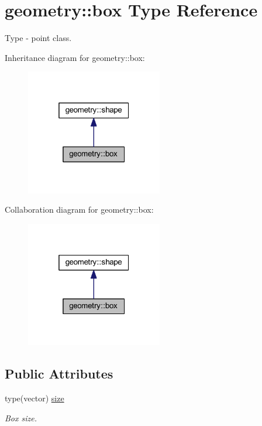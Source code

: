 \hypertarget{structgeometry_1_1box}{}\section{geometry\+:\+:box Type Reference}
\label{structgeometry_1_1box}


Type -\/ point class.  




Inheritance diagram for geometry\+:\+:box\+:\nopagebreak
\begin{figure}[H]
\begin{center}
\leavevmode
\includegraphics[width=169pt]{structgeometry_1_1box__inherit__graph}
\end{center}
\end{figure}


Collaboration diagram for geometry\+:\+:box\+:\nopagebreak
\begin{figure}[H]
\begin{center}
\leavevmode
\includegraphics[width=169pt]{structgeometry_1_1box__coll__graph}
\end{center}
\end{figure}
\subsection*{Public Attributes}
\begin{DoxyCompactItemize}
\item 
type(vector) \mbox{\hyperlink{structgeometry_1_1box_a77c6ce50ff2a5d421ef59cf929f81f3d}{size}}
\begin{DoxyCompactList}\small\item\em Box size. \end{DoxyCompactList}\end{DoxyCompactItemize}


